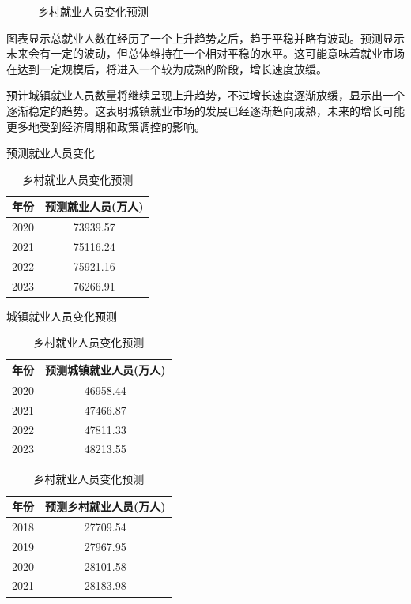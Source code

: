 \begin{figure}[h]
\begin{minipage}{0.3\linewidth}
        \caption{乡村就业人员变化预测}
        \label{fig:fit-vs-real_employment_village}
    \end{minipage}
\end{figure}

图表显示总就业人数在经历了一个上升趋势之后，趋于平稳并略有波动。预测显示未来会有一定的波动，但总体维持在一个相对平稳的水平。这可能意味着就业市场在达到一定规模后，将进入一个较为成熟的阶段，增长速度放缓。

预计城镇就业人员数量将继续呈现上升趋势，不过增长速度逐渐放缓，显示出一个逐渐稳定的趋势。这表明城镇就业市场的发展已经逐渐趋向成熟，未来的增长可能更多地受到经济周期和政策调控的影响。

\begin{table}[h]
    \centering
    \begin{minipage}{0.32\linewidth}
        \centering
        \caption{预测就业人员变化}
        \label{tab:total_employment}
        \begin{tabular}{cc}
        \hline
        年份 & 预测就业人员(万人) \\
        \hline
        2020 & 73939.57 \\
        2021 & 75116.24 \\
        2022 & 75921.16 \\
        2023 & 76266.91 \\
        \hline
        \end{tabular}
    \end{minipage}\hfill
    \begin{minipage}{0.32\linewidth}
        \centering
        \caption{城镇就业人员变化预测}
        \label{tab:urban_employment}
        \begin{tabular}{cc}
        \hline
        年份 & 预测城镇就业人员(万人) \\
        \hline
        2020 & 46958.44 \\
        2021 & 47466.87 \\
        2022 & 47811.33 \\
        2023 & 48213.55 \\
        \hline
        \end{tabular}
    \end{minipage}\hfill
    \begin{minipage}{0.32\linewidth}
        \centering
        \caption{乡村就业人员变化预测}
        \label{tab:rural_employment}
        \begin{tabular}{cc}
        \hline
        年份 & 预测乡村就业人员(万人) \\
        \hline
        2018 & 27709.54 \\
        2019 & 27967.95 \\
        2020 & 28101.58 \\
        2021 & 28183.98 \\
        \hline
        \end{tabular}
    \end{minipage}
\end{table}


